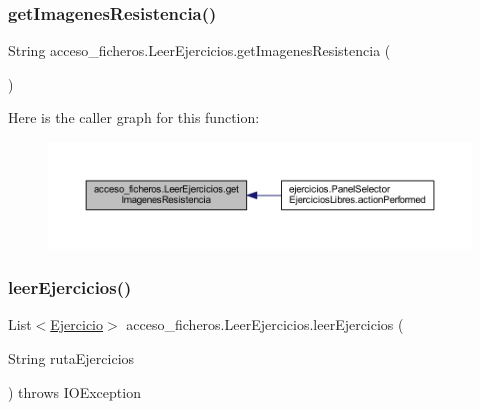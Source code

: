 \subsubsection{\texorpdfstring{get\+Imagenes\+Resistencia()}{getImagenesResistencia()}}
{\footnotesize\ttfamily String acceso\+\_\+ficheros.\+Leer\+Ejercicios.\+get\+Imagenes\+Resistencia (\begin{DoxyParamCaption}{ }\end{DoxyParamCaption})}

Here is the caller graph for this function\+:
\nopagebreak
\begin{figure}[H]
\begin{center}
\leavevmode
\includegraphics[width=350pt]{classacceso__ficheros_1_1_leer_ejercicios_a76b1398f6aa46ed2deb56c6e8b6b27bc_icgraph}
\end{center}
\end{figure}
\mbox{\label{classacceso__ficheros_1_1_leer_ejercicios_a807ed26b56826ddb590bb843b51b400b}} 
\subsubsection{\texorpdfstring{leer\+Ejercicios()}{leerEjercicios()}}
{\footnotesize\ttfamily List$<$\mbox{\hyperlink{classclases_1_1_ejercicio}{Ejercicio}}$>$ acceso\+\_\+ficheros.\+Leer\+Ejercicios.\+leer\+Ejercicios (\begin{DoxyParamCaption}\item[{String}]{ruta\+Ejercicios }\end{DoxyParamCaption}) throws I\+O\+Exception}

